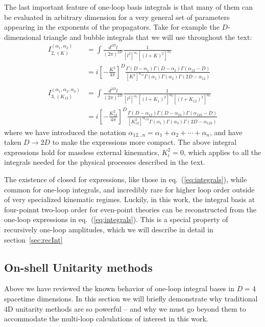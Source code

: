 \documentclass[12pt,letter]{article}
\def\sect#1{section~\ref{#1}}
\def\eqn#1{eq.~(\ref{#1})}
\def\be{\begin{equation}}
\def\ee{\end{equation}}
\begin{document}
The last important feature of one-loop basis integrals is that many of them can be evaluated in arbitrary dimension for a very general set of parameters appearing in the exponents of the propagators. Take for example the $D$-dimensional triangle and bubble integrals that we will use throughout the text:
\be\label{eq:integrals}
\boxed{
\begin{aligned}
I_{2,(K)}^{(\alpha_1,\alpha_2)}&=\int \frac{d^{2D} l}{(2\pi)^{2D}} \frac{1}{[l^2]^{\alpha_1}[(l+K)^2]^{\alpha_2}} 
\\
&=i\left[-\frac{K^2}{4\pi}\right]^D\frac{\Gamma(D-\alpha_1)\Gamma(D-\alpha_2)\Gamma(\alpha_{12}-D)}{[K^2]^{\alpha_{12}}\Gamma(\alpha_1)\Gamma(\alpha_2)\Gamma(2D-\alpha_{12})} 
 \\\\
I_{3,(K_{12})}^{(\alpha_1,\alpha_2,\alpha_3)}&= \int \frac{d^{2D} l}{(2\pi)^{2D}} \frac{1}{[l^2]^{\alpha_1}[(l+K_1)^2]^{\alpha_2}[(l+K_{12})^2]^{\alpha_3}} 
\\
&=i\left[-\frac{K_{12}^2}{4\pi}\right]^D\frac{\Gamma(D-\alpha_{12})\Gamma(D-\alpha_{23})\Gamma(\alpha_{123}-D)}{[K_{12}^2]^{\alpha_{123}}\Gamma(\alpha_1)\Gamma(\alpha_3)\Gamma(2D-\alpha_{123})} 
\end{aligned}
}
\ee
where we have introduced the notation $\alpha_{12...n} = \alpha_1+\alpha_2+\cdots +\alpha_n$, and have taken $D\rightarrow 2D$ to make the expressions more compact. The above integral expressions hold for massless external kinematics, $K_i^2=0$, which applies to all the integrals needed for the physical processes described in the text. 

The existence of closed for expressions, like those in \eqn{eq:integrals}, while common for one-loop integrals, and incredibly rare for higher loop order outside of very specialized kinematic regimes. Luckily, in this work, the integral basis at four-poinnt two-loop order for even-point theories can be reconstructed from the one-loop expressions in \eqn{eq:integrals}. This is a special property of recursively one-loop amplitudes, which we will describe in detail in \sect{sec:recInt}
\subsection{On-shell Unitarity methods}\label{sec:genU}
Above we have reviewed the known behavior of one-loop integral bases in $D=4$ spacetime dimensions. In this section we will briefly demonstrate why traditional 4D unitarity methods are so powerful -- and why we must go beyond them to accommodate the multi-loop calculations of interest in this work. 
\end{document}
